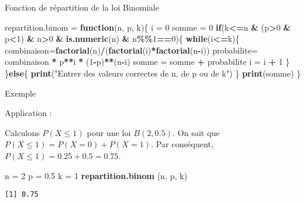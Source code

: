 \documentclass[
  ignorenonframetext,
]{beamer}
\newenvironment{Shaded}{\begin{snugshade}}{\end{snugshade}}
\newcommand{\ControlFlowTok}[1]{\textcolor[rgb]{0.13,0.29,0.53}{\textbf{#1}}}
\newcommand{\DecValTok}[1]{\textcolor[rgb]{0.00,0.00,0.81}{#1}}
\newcommand{\FloatTok}[1]{\textcolor[rgb]{0.00,0.00,0.81}{#1}}
\newcommand{\FunctionTok}[1]{\textcolor[rgb]{0.13,0.29,0.53}{\textbf{#1}}}
\newcommand{\NormalTok}[1]{#1}
\newcommand{\OtherTok}[1]{\textcolor[rgb]{0.56,0.35,0.01}{#1}}
\newcommand{\SpecialCharTok}[1]{\textcolor[rgb]{0.81,0.36,0.00}{\textbf{#1}}}
\newcommand{\StringTok}[1]{\textcolor[rgb]{0.31,0.60,0.02}{#1}}
\begin{document}
\begin{frame}[fragile]{Fonction de répartition de la loi Binomiale}
\protect\hypertarget{fonction-de-ruxe9partition-de-la-loi-binomiale}{}
\begin{Shaded}
\begin{Highlighting}[]
\NormalTok{repartition.binom }\OtherTok{=} \ControlFlowTok{function}\NormalTok{(n, p, k)\{}
\NormalTok{  i }\OtherTok{=} \DecValTok{0}
\NormalTok{  somme }\OtherTok{=} \DecValTok{0}
  \ControlFlowTok{if}\NormalTok{(k}\SpecialCharTok{\textless{}=}\NormalTok{n }\SpecialCharTok{\&}\NormalTok{ (p}\SpecialCharTok{\textgreater{}}\DecValTok{0} \SpecialCharTok{\&}\NormalTok{ p}\SpecialCharTok{\textless{}}\DecValTok{1}\NormalTok{) }\SpecialCharTok{\&}\NormalTok{ n}\SpecialCharTok{\textgreater{}}\DecValTok{0} \SpecialCharTok{\&} \FunctionTok{is.numeric}\NormalTok{(n) }\SpecialCharTok{\&}\NormalTok{ n}\SpecialCharTok{\%\%}\DecValTok{1}\SpecialCharTok{==}\DecValTok{0}\NormalTok{)\{}
    \ControlFlowTok{while}\NormalTok{(i}\SpecialCharTok{\textless{}=}\NormalTok{k)\{}
\NormalTok{      combinaison}\OtherTok{=}\FunctionTok{factorial}\NormalTok{(n)}\SpecialCharTok{/}\NormalTok{(}\FunctionTok{factorial}\NormalTok{(i)}\SpecialCharTok{*}\FunctionTok{factorial}\NormalTok{(n}\SpecialCharTok{{-}}\NormalTok{i))}
\NormalTok{      probabilite}\OtherTok{=}\NormalTok{ combinaison }\SpecialCharTok{*}\NormalTok{ p}\SpecialCharTok{**}\NormalTok{i }\SpecialCharTok{*}\NormalTok{ (}\DecValTok{1}\SpecialCharTok{{-}}\NormalTok{p)}\SpecialCharTok{**}\NormalTok{(n}\SpecialCharTok{{-}}\NormalTok{i)}
\NormalTok{      somme }\OtherTok{=}\NormalTok{ somme }\SpecialCharTok{+}\NormalTok{ probabilite}
\NormalTok{      i }\OtherTok{=}\NormalTok{ i }\SpecialCharTok{+} \DecValTok{1}
\NormalTok{      \}}
\NormalTok{    \}}\ControlFlowTok{else}\NormalTok{\{}
    \FunctionTok{print}\NormalTok{(}\StringTok{"Entrer des valeurs correctes de n, de p ou de k"}\NormalTok{)}
\NormalTok{    \}}
 \FunctionTok{print}\NormalTok{(somme)}
\NormalTok{\}}
\end{Highlighting}
\end{Shaded}
\end{frame}

\begin{frame}[fragile]{Exemple}
\protect\hypertarget{exemple-1}{}

Application : 


Calculons \(P(X \le 1)\) pour une loi \(B(2, 0.5)\). On sait que
\(P(X \le 1) = P(X=0) + P(X=1)\). Par conséquent,
\(P(X \le 1) = 0.25 + 0.5 = 0.75\).

\begin{Shaded}
\begin{Highlighting}[]
\NormalTok{n }\OtherTok{=} \DecValTok{2}
\NormalTok{p }\OtherTok{=} \FloatTok{0.5}
\NormalTok{k }\OtherTok{=} \DecValTok{1}
\FunctionTok{repartition.binom}\NormalTok{ (n, p, k)}
\end{Highlighting}
\end{Shaded}

\begin{verbatim}
[1] 0.75
\end{verbatim}
\end{frame}
\end{document}
